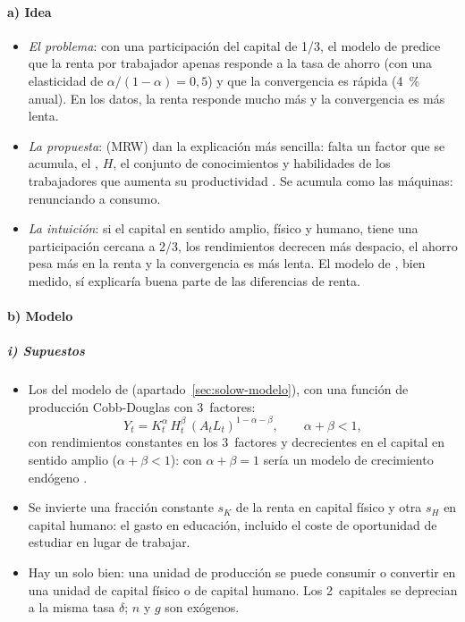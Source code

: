 \documentclass[11pt]{article}
\begin{document}
\paragraph{a) Idea}

\begin{itemize}
\item \emph{El problema}: con una participación del capital de 1/3, el modelo de  predice que la renta por trabajador apenas responde a la tasa de ahorro (con una elasticidad de $\alpha/(1-\alpha)=0{,}5$) y que la convergencia es rápida (4~\% anual). En los datos, la renta responde mucho más y la convergencia es más lenta.
\item \emph{La propuesta}: \textcite{MankiwRomerWeil1992} (MRW) dan la explicación más sencilla: falta un factor que se acumula, el , $H$, el conjunto de conocimientos y habilidades de los trabajadores que aumenta su productividad . Se acumula como las máquinas: renunciando a consumo.
\item \emph{La intuición}: si el capital en sentido amplio, físico y humano, tiene una participación cercana a 2/3, los rendimientos decrecen más despacio, el ahorro pesa más en la renta y la convergencia es más lenta. El modelo de , bien medido, sí explicaría buena parte de las diferencias de renta.
\end{itemize}

\paragraph{b) Modelo}

\subparagraph{i) Supuestos}

\begin{itemize}
\item Los del modelo de  (apartado~\ref{sec:solow-modelo}), con una función de producción Cobb-Douglas con 3~factores:
  \begin{equation}
  Y_t=K_t^{\alpha}\,H_t^{\beta}\,(A_tL_t)^{1-\alpha-\beta},\qquad \alpha+\beta<1,\label{eq:mrw}
  \end{equation}
  con rendimientos constantes en los 3~factores y decrecientes en el capital en sentido amplio ($\alpha+\beta<1$): con $\alpha+\beta=1$ sería un modelo de crecimiento endógeno .
\item Se invierte una fracción constante $s_K$ de la renta en capital físico y otra $s_H$ en capital humano: el gasto en educación, incluido el coste de oportunidad de estudiar en lugar de trabajar.
\item Hay un solo bien: una unidad de producción se puede consumir o convertir en una unidad de capital físico o de capital humano. Los 2~capitales se deprecian a la misma tasa $\delta$; $n$ y $g$ son exógenos.
\end{itemize}
\end{document}

